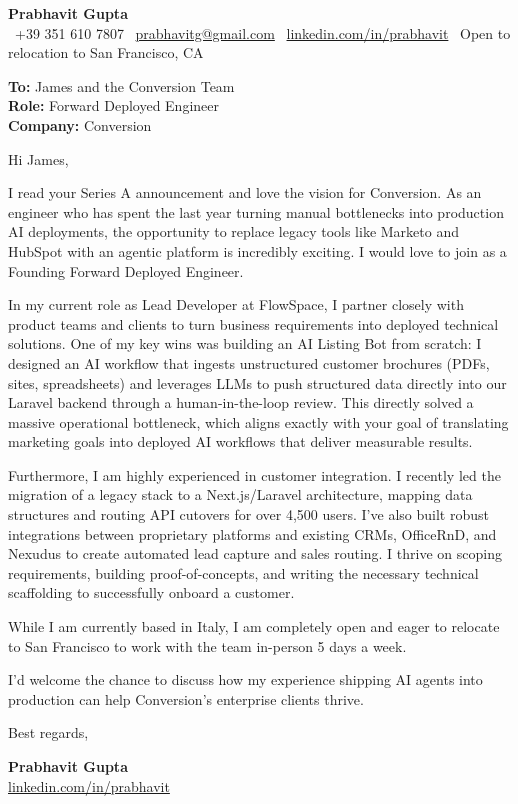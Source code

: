 \documentclass[a4paper,10pt]{article}
\begin{document}
\begin{center}
 {\Huge\bfseries Prabhavit Gupta}\\[5pt]
 \faPhone\ +39 351 610 7807 \quad
 \faEnvelope\ \href{mailto:prabhavitg@gmail.com}{prabhavitg@gmail.com} \quad
 \faLinkedin\ \href{https://www.linkedin.com/in/prabhavit/}{linkedin.com/in/prabhavit} \quad
 \faMapMarker*\ Open to relocation to San Francisco, CA
\end{center}

\vspace{2em}

\textbf{To:} James and the Conversion Team\\
\textbf{Role:} Forward Deployed Engineer\\
\textbf{Company:} Conversion

\vspace{1em}

Hi James,

I read your Series A announcement and love the vision for Conversion. As an engineer who has spent the last year turning manual bottlenecks into production AI deployments, the opportunity to replace legacy tools like Marketo and HubSpot with an agentic platform is incredibly exciting. I would love to join as a Founding Forward Deployed Engineer.

In my current role as Lead Developer at FlowSpace, I partner closely with product teams and clients to turn business requirements into deployed technical solutions. One of my key wins was building an AI Listing Bot from scratch: I designed an AI workflow that ingests unstructured customer brochures (PDFs, sites, spreadsheets) and leverages LLMs to push structured data directly into our Laravel backend through a human-in-the-loop review. This directly solved a massive operational bottleneck, which aligns exactly with your goal of translating marketing goals into deployed AI workflows that deliver measurable results. 

Furthermore, I am highly experienced in customer integration. I recently led the migration of a legacy stack to a Next.js/Laravel architecture, mapping data structures and routing API cutovers for over 4,500 users. I've also built robust integrations between proprietary platforms and existing CRMs, OfficeRnD, and Nexudus to create automated lead capture and sales routing. I thrive on scoping requirements, building proof-of-concepts, and writing the necessary technical scaffolding to successfully onboard a customer. 

While I am currently based in Italy, I am completely open and eager to relocate to San Francisco to work with the team in-person 5 days a week. 

I'd welcome the chance to discuss how my experience shipping AI agents into production can help Conversion's enterprise clients thrive. 

Best regards,

\vspace{1em}
\textbf{Prabhavit Gupta}\\
\href{https://linkedin.com/in/prabhavit}{linkedin.com/in/prabhavit}
\end{document}
